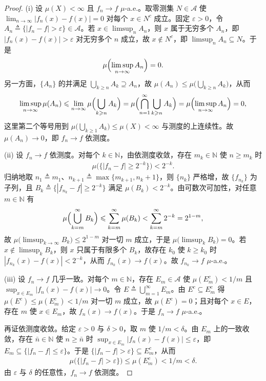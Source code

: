 \documentclass[../../main.tex]{subfiles}%
\begin{document}
\begin{proof}
(i) 设 $\mu(X)<\infty$ 且 $f_n\to f$ $\mu$-a.e.。取零测集 $N\in\mathscr A$ 使 $\lim_{n\to\infty}|f_n(x)-f(x)|=0$ 对每个 $x\in N^c$ 成立。固定 $\varepsilon>0$，令 $A_n\triangleq\{|f_n-f|>\varepsilon\}\in\mathscr A$。若 $x\in\limsup_n A_n$，则 $x$ 属于无穷多个 $A_n$，即 $|f_n(x)-f(x)|>\varepsilon$ 对无穷多个 $n$ 成立，故 $x\notin N^c$，即 $\limsup_nA_n\subseteq N$。于是
\begin{align*}
\mu\Bigl(\limsup_{n\to\infty}A_n\Bigr)=0.
\end{align*}
另一方面，$\{A_n\}$ 的并满足 $\bigcup_{k\geqslant n}A_k\supseteq A_n$，故 $\mu(A_n)\leqslant\mu\bigl(\bigcup_{k\geqslant n}A_k\bigr)$，从而
\begin{align*}
\limsup_{n\to\infty}\mu(A_n)\leqslant\lim_{n\to\infty}\mu\Bigl(\bigcup_{k\geqslant n}A_k\Bigr)=\mu\Bigl(\bigcap_{n=1}^\infty\bigcup_{k\geqslant n}A_k\Bigr)=\mu\Bigl(\limsup_{n\to\infty}A_n\Bigr)=0,
\end{align*}
这里第二个等号用到 $\mu\bigl(\bigcup_{k\geqslant1}A_k\bigr)\leqslant\mu(X)<\infty$ 与测度的上连续性。故 $\mu(A_n)\to0$，即 $f_n\to f$ 依测度。

(ii) 设 $f_n\to f$ 依测度。对每个 $k\in\mathbb{N}$，由依测度收敛，存在 $m_k\in\mathbb{N}$ 使 $n\geqslant m_k$ 时
\begin{align*}
\mu\bigl(\{|f_n-f|\geqslant2^{-k}\}\bigr)<2^{-k}.
\end{align*}
归纳地取 $n_1\triangleq m_1$、$n_{k+1}\triangleq\max\{m_{k+1},n_k+1\}$，则 $\{n_k\}$ 严格增，故 $\{f_{n_k}\}$ 为子列，且 $B_k\triangleq\{|f_{n_k}-f|\geqslant2^{-k}\}$ 满足 $\mu(B_k)<2^{-k}$。由可数次可加性，对任意 $m\in\mathbb{N}$ 有
\begin{align*}
\mu\Bigl(\bigcup_{k=m}^\infty B_k\Bigr)\leqslant\sum_{k=m}^\infty\mu(B_k)<\sum_{k=m}^\infty2^{-k}=2^{1-m},
\end{align*}
故 $\mu\bigl(\limsup_{k\to\infty}B_k\bigr)\leqslant2^{1-m}$ 对一切 $m$ 成立，于是 $\mu\bigl(\limsup_kB_k\bigr)=0$。若 $x\notin\limsup_kB_k$，则 $x$ 只属于有限多个 $B_k$，故存在 $k_0$ 使 $k\geqslant k_0$ 时 $|f_{n_k}(x)-f(x)|<2^{-k}$，从而 $f_{n_k}(x)\to f(x)$。故 $f_{n_k}\to f$ $\mu$-a.e.。

(iii) 设 $f_n\to f$ 几乎一致。对每个 $m\in\mathbb{N}$，存在 $E_m\in\mathscr A$ 使 $\mu(E_m^c)<1/m$ 且 $\sup_{x\in E_m}|f_n(x)-f(x)|\to0$。令 $E\triangleq\bigcup_{m=1}^\infty E_m$。由 $E^c\subseteq E_m^c$ 得 $\mu(E^c)\leqslant\mu(E_m^c)<1/m$ 对一切 $m$ 成立，故 $\mu(E^c)=0$；且对每个 $x\in E$，存在 $m$ 使 $x\in E_m$，故 $f_n(x)\to f(x)$。于是 $f_n\to f$ $\mu$-a.e.。

再证依测度收敛。给定 $\varepsilon>0$ 与 $\delta>0$，取 $m$ 使 $1/m<\delta$。由 $E_m$ 上的一致收敛，存在 $\bar n\in\mathbb{N}$ 使 $n\geqslant\bar n$ 时 $\sup_{x\in E_m}|f_n(x)-f(x)|\leqslant\varepsilon$，即 $E_m\subseteq\{|f_n-f|\leqslant\varepsilon\}$。于是 $\{|f_n-f|>\varepsilon\}\subseteq E_m^c$，从而
\begin{align*}
\mu\bigl(\{|f_n-f|>\varepsilon\}\bigr)\leqslant\mu(E_m^c)<1/m<\delta.
\end{align*}
由 $\varepsilon$ 与 $\delta$ 的任意性，$f_n\to f$ 依测度。
\end{proof}
\end{document}
